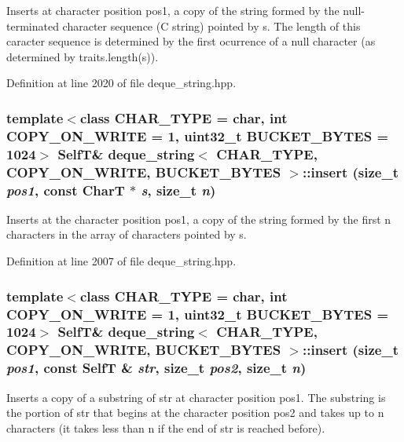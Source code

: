 Inserts at character position pos1, a copy of the string formed by the null-terminated character sequence (C string) pointed by s. The length of this caracter sequence is determined by the first ocurrence of a null character (as determined by traits.length(s)). 

Definition at line 2020 of file deque\_\-string.hpp.\hypertarget{classdeque__string_c547df6a384f56123d3d1a7699ca3d79}{
\subsubsection[{insert}]{\setlength{\rightskip}{0pt plus 5cm}template$<$class CHAR\_\-TYPE  = char, int COPY\_\-ON\_\-WRITE = 1, uint32\_\-t BUCKET\_\-BYTES = 1024$>$ {\bf SelfT}\& {\bf deque\_\-string}$<$ CHAR\_\-TYPE, COPY\_\-ON\_\-WRITE, BUCKET\_\-BYTES $>$::insert (size\_\-t {\em pos1}, \/  const CharT $\ast$ {\em s}, \/  size\_\-t {\em n})}}
\label{classdeque__string_c547df6a384f56123d3d1a7699ca3d79}


Inserts at the character position pos1, a copy of the string formed by the first n characters in the array of characters pointed by s. 

Definition at line 2007 of file deque\_\-string.hpp.\hypertarget{classdeque__string_c273e9d441667b1ff923864a61ad5be1}{
\subsubsection[{insert}]{\setlength{\rightskip}{0pt plus 5cm}template$<$class CHAR\_\-TYPE  = char, int COPY\_\-ON\_\-WRITE = 1, uint32\_\-t BUCKET\_\-BYTES = 1024$>$ {\bf SelfT}\& {\bf deque\_\-string}$<$ CHAR\_\-TYPE, COPY\_\-ON\_\-WRITE, BUCKET\_\-BYTES $>$::insert (size\_\-t {\em pos1}, \/  const {\bf SelfT} \& {\em str}, \/  size\_\-t {\em pos2}, \/  size\_\-t {\em n})}}
\label{classdeque__string_c273e9d441667b1ff923864a61ad5be1}


Inserts a copy of a substring of str at character position pos1. The substring is the portion of str that begins at the character position pos2 and takes up to n characters (it takes less than n if the end of str is reached before). 

